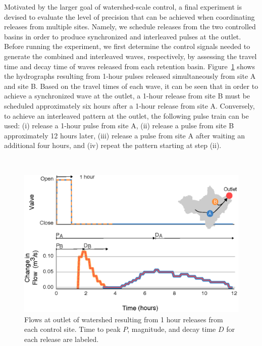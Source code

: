 Motivated by the larger goal of watershed-scale control, a final experiment is devised to evaluate the level of precision that can be achieved when coordinating releases from multiple sites. Namely, we schedule releases from the two controlled basins in order to produce synchronized and interleaved pulses at the outlet. Before running the experiment, we first determine the control signals needed to generate the combined and interleaved waves, respectively, by assessing the travel time and decay time of waves released from each retention basin. Figure~\ref{fig-ch2:6} shows the hydrographs resulting from 1-hour pulses released simultaneously from site A and site B. Based on the travel times of each wave, it can be seen that in order to achieve a synchronized wave at the outlet, a 1-hour release from site B must be scheduled approximately six hours after a 1-hour release from site A. Conversely, to achieve an interleaved pattern at the outlet, the following pulse train can be used: (i) release a 1-hour pulse from site A, (ii) release a pulse from site B approximately 12 hours later, (iii) release a pulse from site A after waiting an additional four hours, and (iv) repeat the pattern starting at step (ii).

\

\begin{figure}
    \centering
    \includegraphics[width=\textwidth]{gfx/Chapter-2/Figure4.eps}
    \caption{Flows at outlet of watershed resulting from 1 hour releases from each control site. Time to peak $P$, magnitude, and decay time $D$ for each release are labeled.}\label{fig-ch2:6}
\end{figure}



